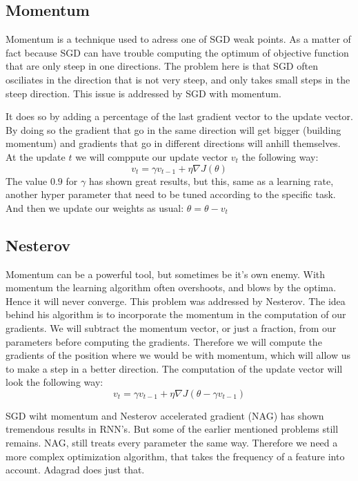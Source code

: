 \subsection{Momentum}
Momentum is a technique used to adress one of SGD weak points. As a matter of fact because SGD can have trouble computing the optimum of objective function that are only steep in one directions. The problem here is that SGD often osciliates in the direction that is not very steep, and only takes small steps in the steep direction. This issue is addressed by SGD with momentum. 

It does so by adding a percentage of the last gradient vector  to the update vector. By doing so the gradient that go in the same direction will get bigger (building momentum) and gradients that go in different directions will anhill themselves. 
 At the update $t$ we will comppute our update vector $v_t$ the following way:
\begin{equation}
v_t = \gamma v_{t-1} + \eta \nabla J (\theta)
\end{equation}
The value $0.9$ for $\gamma$ has shown great results, but this, same as a learning rate, another hyper parameter that need to be tuned according to the specific task. 
And then we update our weights as usual: $\theta = \theta - v_t$ 
\subsection{Nesterov}
Momentum can be a powerful tool, but sometimes be it's own enemy. With momentum the learning algorithm often overshoots, and blows by the  optima. Hence it will never converge. This problem was addressed by Nesterov. The idea behind his algorithm is to incorporate the momentum in the computation of our gradients. We will subtract the momentum vector, or just a fraction,  from our parameters before computing the gradients. Therefore we will compute the gradients of the position where we would be with momentum, which will allow us to make a step in a better direction. The computation of the update vector will look the following way:
\begin{equation}
v_t = \gamma v_{t-1} + \eta \nabla J (\theta -  \gamma v_{t-1})
\end{equation}

SGD wiht momentum and Nesterov accelerated gradient (NAG) has shown tremendous results in RNN's. But some of the earlier mentioned problems still remains.  NAG, still treats every parameter the same way. Therefore we need a more complex optimization algorithm, that takes the frequency of a feature into account. Adagrad does just that. 

